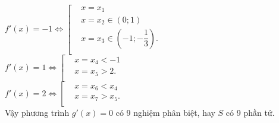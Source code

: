 \begin{ex} 
{			$ f'(x)=-1\Leftrightarrow \left[ \begin{aligned}
				& x=x_1 \\
				& x=x_2\in (0;1)\\
				& x=x_3\in \left(-1;-\dfrac{1}{3}\right).\\
			\end{aligned} \right.$\\
			$ f'(x)=1\Leftrightarrow \left[ \begin{aligned}
				& x=x_4<-1 \\
				& x=x_5>2 .\\
			\end{aligned} \right.$\\
			$ f'(x)=2\Leftrightarrow \left[ \begin{aligned}
				& x=x_6<x_4 \\
				& x=x_7>x_5. \\
			\end{aligned} \right.$\\
			Vậy phương trình $ g'(x)=0$ có 9 nghiệm phân biệt, hay $S$ có 9 phần tử.
		}
	\end{ex}
